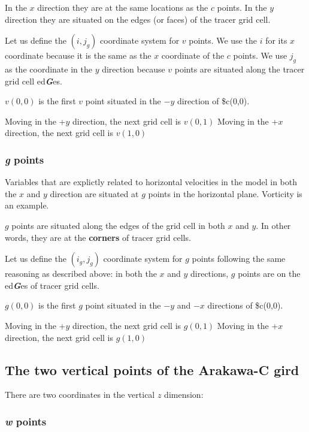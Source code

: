 \documentclass[11pt]{article}
\begin{document}
In the \(x\) direction they are at the same locations as the \(c\)
points. In the \(y\) direction they are situated on the edges (or faces)
of the tracer grid cell.

Let us define the \((i, j_g)\) coordinate system for \(v\) points. We
use the \(i\) for its \(x\) coordinate because it is the same as the
\(x\) coordinate of the \(c\) points. We use \(j_g\) as the coordinate
in the \(y\) direction because \(v\) points are situated along the
tracer grid cell ed\textbf{\emph{G}}es.

\(v(0,0)\) is the first \(v\) point situated in the \(-y\) direction of
\$c(0,0).

Moving in the +\(y\) direction, the next grid cell is \(v(0,1)\) Moving
in the +\(x\) direction, the next grid cell is \(v(1,0)\)

\subsubsection{\texorpdfstring{\emph{g}
points}{g points}}\label{g-points}

Variables that are explictly related to horizontal velocities in the
model in both the \(x\) and \(y\) direction are situated at \(g\) points
in the horizontal plane. Vorticity is an example.

\(g\) points are situated along the edges of the grid cell in both \(x\)
and \(y\). In other words, they are at the \textbf{corners} of tracer
grid cells.

Let us define the \((i_g, j_g)\) coordinate system for \(g\) points
following the same reasoning as described above: in both the \(x\) and
\(y\) directions, \(g\) points are on the ed\textbf{\emph{G}}es of
tracer grid cells.

\(g(0,0)\) is the first \(g\) point situated in the \(-y\) and \(-x\)
directions of \$c(0,0).

Moving in the +\(y\) direction, the next grid cell is \(g(0,1)\) Moving
in the +\(x\) direction, the next grid cell is \(g(1,0)\)

\subsection{The two vertical points of the Arakawa-C
gird}\label{the-two-vertical-points-of-the-arakawa-c-gird}

There are two coordinates in the vertical \(z\) dimension:

\subsubsection{\texorpdfstring{\emph{w}
points}{w points}}\label{w-points}
\end{document}
